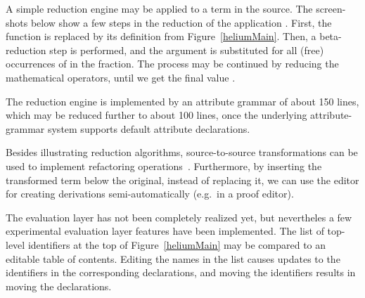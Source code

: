 

%


A simple reduction engine may be applied to a term in the source. The screen-shots below show a few steps in the reduction of the application . First, the function  is replaced by its definition from Figure~\ref{heliumMain}. Then, a beta-reduction step is performed, and the argument  is substituted for all (free) occurrences of  in the fraction. The process may be continued by reducing the mathematical operators, until we get the final value .

 
 

The reduction engine is implemented by an attribute grammar of about 150 lines, which may be reduced further to about 100 lines, once the underlying attribute-grammar system supports default attribute declarations.

Besides illustrating reduction algorithms, source-to-source transformations can be used to implement refactoring operations~\cite{reinke03refactoring}. Furthermore, by inserting the transformed term below the original, instead of replacing it, we can use the editor for creating derivations semi-automatically (e.g.\ in a proof editor).




The evaluation layer has not been completely realized yet, but nevertheles a few experimental evaluation layer features have been implemented. The list of top-level identifiers at the top of Figure~\ref{heliumMain} may be compared to an editable table of contents. Editing the names in the list causes updates to the identifiers in the corresponding declarations, and moving the identifiers results in moving the declarations.

\toHere
\fromHere


